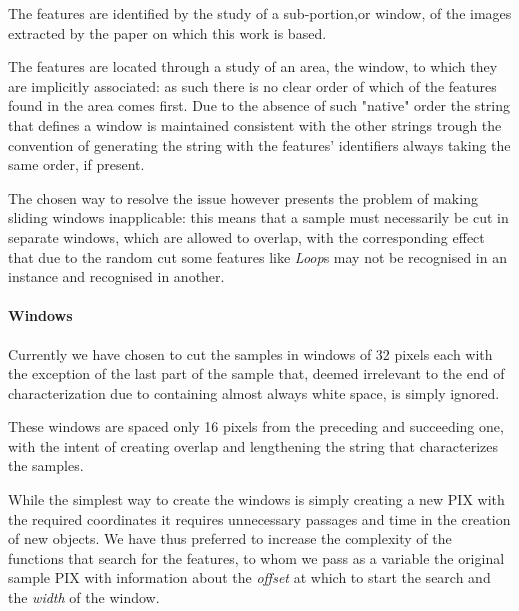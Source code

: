 \documentclass[a4paper,12pt]{article}
\begin{document}
The features are identified by the study of a sub-portion,or window, of the images extracted by the paper on which this work is based.

The features are located through a study of an area, the window, to which they are implicitly associated: as such there is no clear order of which of the features found in the area comes first.
Due to the absence of such "native" order the string that defines a window is maintained consistent with the other strings trough the convention of generating the string with the features' identifiers always taking the same order, if present.

The chosen way to resolve the issue however presents the problem of making sliding windows inapplicable: this means that a sample must necessarily be cut in separate windows, which are allowed to overlap, with the corresponding effect that due to the random cut some features like \textit{Loop}s may not be recognised in an instance and recognised in another. 

\paragraph{Windows}
Currently we have chosen to cut the samples in windows of 32 pixels each with the exception of the last part of the sample that, deemed irrelevant to the end of characterization due to containing almost always white space, is simply ignored.

These windows are spaced only 16 pixels from the preceding and succeeding one, with the intent of creating overlap and lengthening the string that characterizes the samples.

While the simplest way to create the windows is simply creating a new PIX with the required coordinates it requires unnecessary passages and time in the creation of new objects. We have thus preferred to increase the complexity of the functions that search for the features, to whom we pass as a variable the original sample PIX with information about the \textit{offset} at which to start the search and the \textit{width} of the window.


\end{document}
